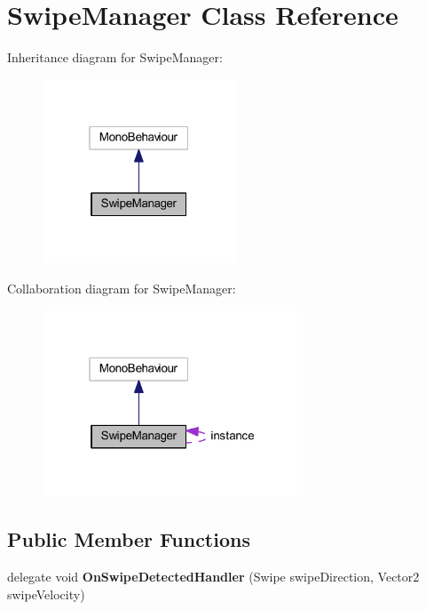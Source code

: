 \hypertarget{class_swipe_manager}{}\section{Swipe\+Manager Class Reference}
\label{class_swipe_manager}


Inheritance diagram for Swipe\+Manager\+:\nopagebreak
\begin{figure}[H]
\begin{center}
\leavevmode
\includegraphics[width=163pt]{class_swipe_manager__inherit__graph}
\end{center}
\end{figure}


Collaboration diagram for Swipe\+Manager\+:\nopagebreak
\begin{figure}[H]
\begin{center}
\leavevmode
\includegraphics[width=220pt]{class_swipe_manager__coll__graph}
\end{center}
\end{figure}
\subsection*{Public Member Functions}
\begin{DoxyCompactItemize}
\item 
\mbox{\label{class_swipe_manager_a822e0bd724cfd6c74035e5da426bb542}} 
delegate void {\bfseries On\+Swipe\+Detected\+Handler} (Swipe swipe\+Direction, Vector2 swipe\+Velocity)
\end{DoxyCompactItemize}
